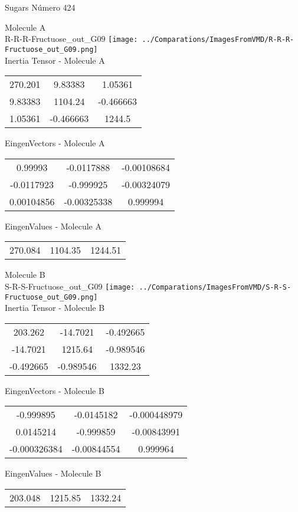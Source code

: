 \vtab[-2cm]
\begin{center}
{\large Sugars \tab Número 424}
\end{center}
\begin{multicols}{2}
\begin{center}

Molecule A \\ 
R-R-R-Fructuose\_out\_G09
\texttt{[image: ../Comparations/ImagesFromVMD/R-R-R-Fructuose\_out\_G09.png]}
\\
Inertia Tensor - Molecule A \\
\vtab

\begin{tabular}{|c c c|}
270.201	 & 	9.83383	 & 	1.05361	 \\
9.83383	 & 	1104.24	 & 	-0.466663	 \\
1.05361	 & 	-0.466663	 & 	1244.5
\end{tabular}

\vtab
 EingenVectors - Molecule A     \\
\vtab
\begin{tabular}{|c c c|}
0.99993	 & 	-0.0117888	 & 	-0.00108684	 \\
-0.0117923	 & 	-0.999925	 & 	-0.00324079	 \\
0.00104856	 & 	-0.00325338	 & 	0.999994
\end{tabular}

\vtab
 EingenValues - Molecule A     \\
\vtab
\begin{tabular}{|c c c|}
270.084	 & 	1104.35	 & 	1244.51	 \\
\end{tabular}
\columnbreak

Molecule B \\ 
S-R-S-Fructuose\_out\_G09
\texttt{[image: ../Comparations/ImagesFromVMD/S-R-S-Fructuose\_out\_G09.png]}
\\
Inertia Tensor - Molecule B \\
\vtab

\begin{tabular}{|c c c|}
203.262	 & 	-14.7021	 & 	-0.492665	 \\
-14.7021	 & 	1215.64	 & 	-0.989546	 \\
-0.492665	 & 	-0.989546	 & 	1332.23
\end{tabular}

\vtab
 EingenVectors - Molecule B     \\
\vtab
\begin{tabular}{|c c c|}
-0.999895	 & 	-0.0145182	 & 	-0.000448979	 \\
0.0145214	 & 	-0.999859	 & 	-0.00843991	 \\
-0.000326384	 & 	-0.00844554	 & 	0.999964
\end{tabular}

\vtab
 EingenValues - Molecule B     \\
\vtab
\begin{tabular}{|c c c|}
203.048	 & 	1215.85	 & 	1332.24	 \\
\end{tabular}

\end{center}
\end{multicols}
